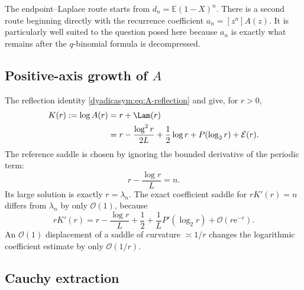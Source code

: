 \documentclass[11pt,oneside]{article}
\theoremstyle{definition}
\theoremstyle{remark}
\newcommand{\e}{\mathrm e}
\newcommand{\E}{\mathbb E}
\newcommand{\bigO}{\mathcal O}
\begin{document}
The endpoint--Laplace route starts from $d_n=\E(1-X)^n$.  There is a second route beginning
directly with the recurrence coefficient $a_n=[z^n]A(z)$.  It is particularly well suited to
the question posed here because $a_n$ is exactly what remains after the $q$-binomial formula
is decompressed.

\subsection{Positive-axis growth of \texorpdfstring{$A$}{A}}

The reflection identity \eqref{dyadicasym:eq:A-reflection} and
 give, for $r>0$,
\begin{align}
 K(r):=\log A(r)
 ={}&r+\Lam(r)                                               \notag\\
 ={}&r-\frac{\log^2r}{2L}+\frac12\log r
 +P(\log_2r)+\mathcal E(r).                                \label{dyadicasym:eq:K-positive}
\end{align}
The reference saddle is chosen by ignoring the bounded derivative of the periodic term:
\begin{equation}
 r-\frac{\log r}{L}=n.                                      \label{dyadicasym:eq:reference-saddle}
\end{equation}
Its large solution is exactly $r=\lambda_n$.  The exact coefficient saddle for
$rK'(r)=n$ differs from $\lambda_n$ by only $\bigO(1)$, because
\begin{equation}
 rK'(r)=r-\frac{\log r}{L}+\frac12+\frac1L P'(\log_2r)
 +\bigO(r\e^{-r}).                                          \label{dyadicasym:eq:exact-saddle-shift}
\end{equation}
An $\bigO(1)$ displacement of a saddle of curvature $\asymp1/r$ changes the logarithmic
coefficient estimate by only $\bigO(1/r)$.

\subsection{Cauchy extraction}
\end{document}
